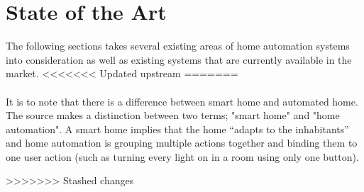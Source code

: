 \section{State of the Art}
The following sections takes several existing areas of home automation systems into consideration as well as existing systems that are currently available in the market.
<<<<<<< Updated upstream
=======
\\\\
It is to note that there is a difference between smart home and automated home. The source \cite{HAInterviews} makes a distinction between two terms; "smart home" and "home automation". A smart home implies that the home \enquote{adapts to the inhabitants}\cite{HAInterviews} and home automation is grouping multiple actions together and binding them to one user action (such as turning every light on in a room using only one button).

>>>>>>> Stashed changes



